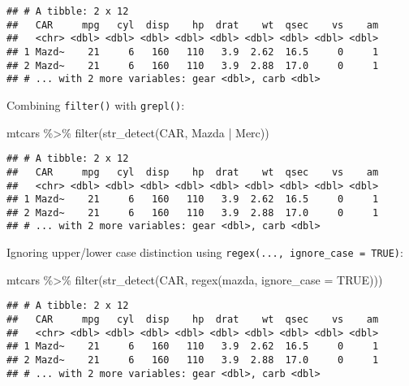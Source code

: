 \documentclass[
]{book}
\newenvironment{Shaded}{\begin{snugshade}}{\end{snugshade}}
\newcommand{\AttributeTok}[1]{\textcolor[rgb]{0.77,0.63,0.00}{#1}}
\newcommand{\ConstantTok}[1]{\textcolor[rgb]{0.00,0.00,0.00}{#1}}
\newcommand{\FunctionTok}[1]{\textcolor[rgb]{0.00,0.00,0.00}{#1}}
\newcommand{\NormalTok}[1]{#1}
\newcommand{\SpecialCharTok}[1]{\textcolor[rgb]{0.00,0.00,0.00}{#1}}
\newcommand{\StringTok}[1]{\textcolor[rgb]{0.31,0.60,0.02}{#1}}
\begin{document}
\begin{verbatim}
## # A tibble: 2 x 12
##   CAR     mpg   cyl  disp    hp  drat    wt  qsec    vs    am
##   <chr> <dbl> <dbl> <dbl> <dbl> <dbl> <dbl> <dbl> <dbl> <dbl>
## 1 Mazd~    21     6   160   110   3.9  2.62  16.5     0     1
## 2 Mazd~    21     6   160   110   3.9  2.88  17.0     0     1
## # ... with 2 more variables: gear <dbl>, carb <dbl>
\end{verbatim}

Combining \texttt{filter()} with \texttt{grepl()}:

\begin{Shaded}
\begin{Highlighting}[]
\NormalTok{mtcars }\SpecialCharTok{\%\textgreater{}\%} \FunctionTok{filter}\NormalTok{(}\FunctionTok{str\_detect}\NormalTok{(CAR, }\StringTok{\textquotesingle{}Mazda | Merc\textquotesingle{}}\NormalTok{))}
\end{Highlighting}
\end{Shaded}

\begin{verbatim}
## # A tibble: 2 x 12
##   CAR     mpg   cyl  disp    hp  drat    wt  qsec    vs    am
##   <chr> <dbl> <dbl> <dbl> <dbl> <dbl> <dbl> <dbl> <dbl> <dbl>
## 1 Mazd~    21     6   160   110   3.9  2.62  16.5     0     1
## 2 Mazd~    21     6   160   110   3.9  2.88  17.0     0     1
## # ... with 2 more variables: gear <dbl>, carb <dbl>
\end{verbatim}

Ignoring upper/lower case distinction using \texttt{regex(...,\ ignore\_case\ =\ TRUE)}:

\begin{Shaded}
\begin{Highlighting}[]
\NormalTok{mtcars }\SpecialCharTok{\%\textgreater{}\%} \FunctionTok{filter}\NormalTok{(}\FunctionTok{str\_detect}\NormalTok{(CAR, }\FunctionTok{regex}\NormalTok{(}\StringTok{\textquotesingle{}mazda\textquotesingle{}}\NormalTok{, }\AttributeTok{ignore\_case =} \ConstantTok{TRUE}\NormalTok{)))}
\end{Highlighting}
\end{Shaded}

\begin{verbatim}
## # A tibble: 2 x 12
##   CAR     mpg   cyl  disp    hp  drat    wt  qsec    vs    am
##   <chr> <dbl> <dbl> <dbl> <dbl> <dbl> <dbl> <dbl> <dbl> <dbl>
## 1 Mazd~    21     6   160   110   3.9  2.62  16.5     0     1
## 2 Mazd~    21     6   160   110   3.9  2.88  17.0     0     1
## # ... with 2 more variables: gear <dbl>, carb <dbl>
\end{verbatim}
\end{document}
